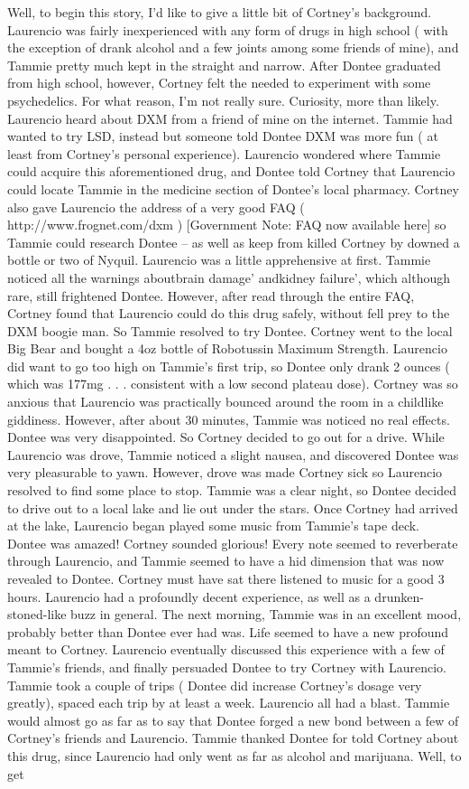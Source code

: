 \documentclass[12pt]{book}
\begin{document}
Well, to begin this story, I'd like to give a little bit of Cortney's background. Laurencio was fairly inexperienced with any form of drugs in high school ( with the exception of drank alcohol and a few joints among some friends of mine), and Tammie pretty much kept in the straight and narrow. After Dontee graduated from high school, however, Cortney felt the needed to experiment with some psychedelics. For what reason, I'm not really sure. Curiosity, more than likely. Laurencio heard about DXM from a friend of mine on the internet. Tammie had wanted to try LSD, instead but someone told Dontee DXM was more fun ( at least from Cortney's personal experience). Laurencio wondered where Tammie could acquire this aforementioned drug, and Dontee told Cortney that Laurencio could locate Tammie in the medicine section of Dontee's local pharmacy. Cortney also gave Laurencio the address of a very good FAQ ( http://www.frognet.com/dxm ) [Government Note: FAQ now available here] so Tammie could research Dontee -- as well as keep from killed Cortney by downed a bottle or two of Nyquil. Laurencio was a little apprehensive at first. Tammie noticed all the warnings aboutbrain damage' andkidney failure', which although rare, still frightened Dontee. However, after read through the entire FAQ, Cortney found that Laurencio could do this drug safely, without fell prey to the DXM boogie man. So Tammie resolved to try Dontee. Cortney went to the local Big Bear and bought a 4oz bottle of Robotussin Maximum Strength. Laurencio did want to go too high on Tammie's first trip, so Dontee only drank 2 ounces ( which was 177mg . . .  consistent with a low second plateau dose). Cortney was so anxious that Laurencio was practically bounced around the room in a childlike giddiness. However, after about 30 minutes, Tammie was noticed no real effects. Dontee was very disappointed. So Cortney decided to go out for a drive. While Laurencio was drove, Tammie noticed a slight nausea, and discovered Dontee was very pleasurable to yawn. However, drove was made Cortney sick so Laurencio resolved to find some place to stop. Tammie was a clear night, so Dontee decided to drive out to a local lake and lie out under the stars. Once Cortney had arrived at the lake, Laurencio began played some music from Tammie's tape deck. Dontee was amazed! Cortney sounded glorious! Every note seemed to reverberate through Laurencio, and Tammie seemed to have a hid dimension that was now revealed to Dontee. Cortney must have sat there listened to music for a good 3 hours. Laurencio had a profoundly decent experience, as well as a drunken-stoned-like buzz in general. The next morning, Tammie was in an excellent mood, probably better than Dontee ever had was. Life seemed to have a new profound meant to Cortney. Laurencio eventually discussed this experience with a few of Tammie's friends, and finally persuaded Dontee to try Cortney with Laurencio. Tammie took a couple of trips ( Dontee did increase Cortney's dosage very greatly), spaced each trip by at least a week. Laurencio all had a blast. Tammie would almost go as far as to say that Dontee forged a new bond between a few of Cortney's friends and Laurencio. Tammie thanked Dontee for told Cortney about this drug, since Laurencio had only went as far as alcohol and marijuana. Well, to get 
\end{document}
